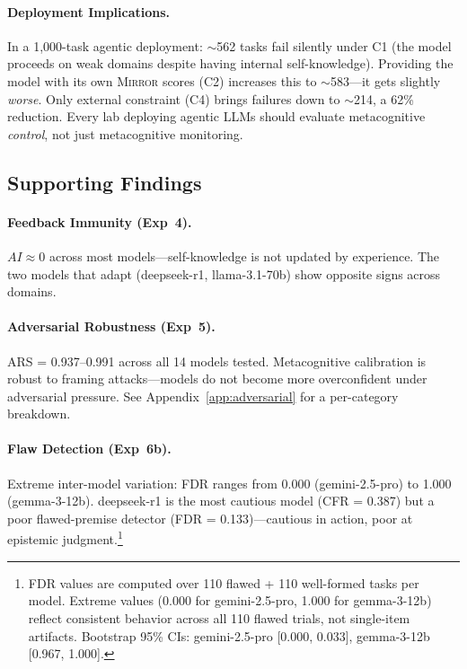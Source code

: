 \documentclass[10pt]{article}
\newcommand{\mirror}{\textsc{Mirror}}
\newcommand{\ARS}{ARS}
\newcommand{\CFR}{CFR}
\newcommand{\FDR}{FDR}
\newcommand{\AI}{AI}
\begin{document}
\paragraph{Deployment Implications.}
In a 1,000-task agentic deployment: ${\sim}$562 tasks fail silently under C1 (the
model proceeds on weak domains despite having internal self-knowledge). Providing
the model with its own \mirror{} scores (C2) increases this to ${\sim}$583---it
gets slightly \textit{worse}. Only external constraint (C4) brings failures down to
${\sim}$214, a 62\% reduction. Every lab deploying agentic LLMs should evaluate
metacognitive \textit{control}, not just metacognitive monitoring.

\subsection{Supporting Findings}

\paragraph{Feedback Immunity (Exp~4).}
$\AI{} \approx 0$ across most models---self-knowledge is not updated by experience. The two models that adapt (deepseek-r1, llama-3.1-70b) show opposite signs across domains.

\paragraph{Adversarial Robustness (Exp~5).}
\ARS{} = 0.937--0.991 across all 14 models tested. Metacognitive calibration is
robust to framing attacks---models do not become more overconfident under
adversarial pressure. See Appendix~\ref{app:adversarial} for a per-category breakdown.

\paragraph{Flaw Detection (Exp~6b).}
Extreme inter-model variation: \FDR{} ranges from 0.000 (gemini-2.5-pro) to 1.000 (gemma-3-12b). deepseek-r1 is the most cautious model (\CFR{} = 0.387) but a poor flawed-premise detector (\FDR{} = 0.133)---cautious in action, poor at epistemic judgment.\footnote{FDR values are computed over 110 flawed + 110 well-formed tasks per model. Extreme values (0.000 for gemini-2.5-pro, 1.000 for gemma-3-12b) reflect consistent behavior across all 110 flawed trials, not single-item artifacts. Bootstrap 95\% CIs: gemini-2.5-pro [0.000, 0.033], gemma-3-12b [0.967, 1.000].}
\end{document}
